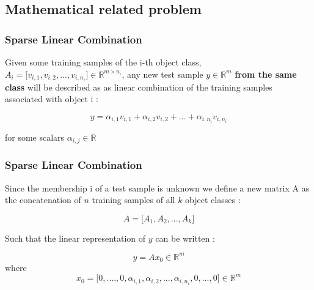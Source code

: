 \documentclass{beamer}
\begin{document}

	
	\subsection{Mathematical related problem}
	
	
		\begin{frame}
		\frametitle{Sparse Linear Combination}

Given some training samples of the i-th object class, $A_{i}=\lbrack v_{i,1},v_{i,2},...,v_{i,n_{i}} \rbrack \in \mathbb{R}^{m \times n_{i}} $, any new test sample $y \in \mathbb{R}^{m}$ \textbf{from the same class} will be described as as linear combination of the training samples associated with object i :

$$y=\alpha_{i,1}v_{i,1}+\alpha_{i,2}v_{i,2}+...+\alpha_{i,n_{i}}v_{i,n_{i}}$$

for some scalars $\alpha_{i,j} \in \mathbb{R}$

		\end{frame}

		\begin{frame}
		\frametitle{Sparse Linear Combination}

Since the membership i of a test sample is unknown we define a new matrix A as the concatenation of $n$ training samples of all $k$ object classes :

$$A=\lbrack A_{1},A_{2},...,A_{k} \rbrack $$

Such that the linear representation of $y$ can be written :

$$y=Ax_{0}  \in \mathbb{R}^{m} $$
where 
$$x_{0}=\lbrack 0,....,0,\alpha_{i,1},\alpha_{i,2},...,\alpha_{i,n_{i}},0,...,0  \rbrack \in \mathbb{R}^{m}$$


		\end{frame}

		
\end{document}

